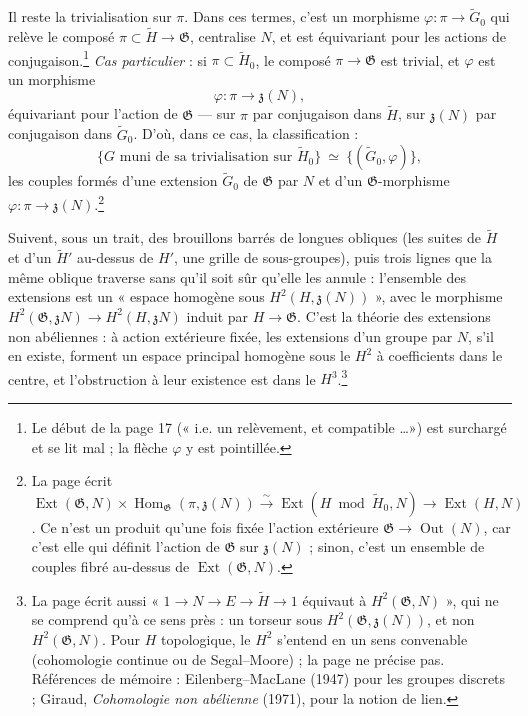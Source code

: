 \documentclass[11pt,a4paper]{article}
\begin{document}
Il reste la trivialisation sur $\pi$. Dans ces termes, c'est un morphisme
$\varphi : \pi \to \widetilde{G}_0$ qui relève le composé $\pi \subset
\widetilde{H} \to \mathfrak{G}$, centralise $N$, et est équivariant pour les
actions de conjugaison.\footnote{Le début de la page 17 (« i.e. un
relèvement, et compatible \dots ») est surchargé et se lit mal ; la flèche
$\varphi$ y est pointillée.} \emph{Cas particulier} : si $\pi \subset
\widetilde{H}_0$, le composé $\pi \to \mathfrak{G}$ est trivial, et
$\varphi$ est un morphisme
\[
  \varphi : \pi \longrightarrow \mathfrak{z}(N) ,
\]
équivariant pour l'action de $\mathfrak{G}$ — sur $\pi$ par conjugaison dans
$\widetilde{H}$, sur $\mathfrak{z}(N)$ par conjugaison dans
$\widetilde{G}_0$. D'où, dans ce cas, la classification :
\[
  \bigl\{ G \text{ muni de sa trivialisation sur } \widetilde{H}_0 \bigr\}
  \ \simeq\ \bigl\{ (\widetilde{G}_0, \varphi) \bigr\} ,
\]
les couples formés d'une extension $\widetilde{G}_0$ de $\mathfrak{G}$ par
$N$ et d'un $\mathfrak{G}$-morphisme $\varphi : \pi \to
\mathfrak{z}(N)$.\footnote{La page écrit
$\operatorname{Ext}(\mathfrak{G}, N) \times
\operatorname{Hom}_{\mathfrak{G}}(\pi, \mathfrak{z}(N)) \xrightarrow{\sim}
\operatorname{Ext}(H \bmod \widetilde{H}_0, N) \to \operatorname{Ext}(H, N)$.
Ce n'est un produit qu'une fois fixée l'action extérieure
$\mathfrak{G} \to \operatorname{Out}(N)$, car c'est elle qui définit l'action
de $\mathfrak{G}$ sur $\mathfrak{z}(N)$ ; sinon, c'est un ensemble de
couples fibré au-dessus de $\operatorname{Ext}(\mathfrak{G}, N)$.}

Suivent, sous un trait, des brouillons barrés de longues obliques (les suites
de $\widetilde{H}$ et d'un $\widetilde{H}'$ au-dessus de $H'$, une grille de
sous-groupes), puis trois lignes que la même oblique traverse sans qu'il soit
sûr qu'elle les annule : l'ensemble des extensions est un « espace homogène
sous $H^2(H, \mathfrak{z}(N))$ », avec le morphisme $H^2(\mathfrak{G},
\mathfrak{z}N) \to H^2(H, \mathfrak{z}N)$ induit par $H \to \mathfrak{G}$.
C'est la théorie des extensions non abéliennes : à action extérieure fixée,
les extensions d'un groupe par $N$, s'il en existe, forment un espace
principal homogène sous le $H^2$ à coefficients dans le centre, et
l'obstruction à leur existence est dans le $H^3$.\footnote{La page écrit
aussi « $1 \to N \to E \to \widetilde{H} \to 1$ équivaut à
$H^2(\mathfrak{G}, N)$ », qui ne se comprend qu'à ce sens près : un
torseur sous $H^2(\mathfrak{G}, \mathfrak{z}(N))$, et non $H^2(\mathfrak{G},
N)$. Pour $H$ topologique, le $H^2$ s'entend en un sens convenable
(cohomologie continue ou de Segal--Moore) ; la page ne précise pas.
Références de mémoire : Eilenberg--MacLane (1947) pour les groupes
discrets ; Giraud, \emph{Cohomologie non abélienne} (1971), pour la notion de
lien.}
\end{document}
